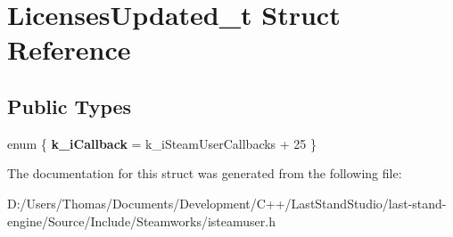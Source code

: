 \hypertarget{structLicensesUpdated__t}{}\section{Licenses\+Updated\+\_\+t Struct Reference}
\label{structLicensesUpdated__t}
\subsection*{Public Types}
\begin{DoxyCompactItemize}
\item 
\hypertarget{structLicensesUpdated__t_ae7cbd23d45cd5e955874ebe48c2cff9f}{}enum \{ {\bfseries k\+\_\+i\+Callback} = k\+\_\+i\+Steam\+User\+Callbacks + 25
 \}\label{structLicensesUpdated__t_ae7cbd23d45cd5e955874ebe48c2cff9f}

\end{DoxyCompactItemize}


The documentation for this struct was generated from the following file\+:\begin{DoxyCompactItemize}
\item 
D\+:/\+Users/\+Thomas/\+Documents/\+Development/\+C++/\+Last\+Stand\+Studio/last-\/stand-\/engine/\+Source/\+Include/\+Steamworks/isteamuser.\+h\end{DoxyCompactItemize}
